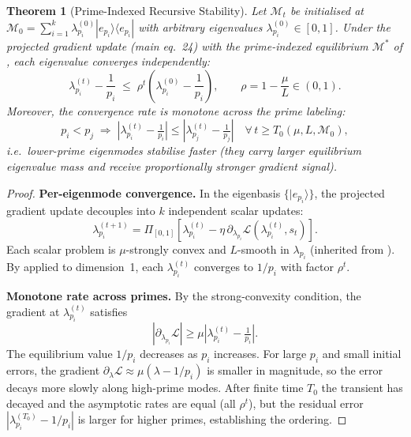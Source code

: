 \documentclass[12pt,letterpaper]{article}
\theoremstyle{plain}
\newtheorem{theorem}{Theorem}[section]
\theoremstyle{definition}
\newcommand{\M}{\mathcal{M}}
\newcommand{\calL}{\mathcal{L}}
\begin{document}
\begin{theorem}[Prime-Indexed Recursive Stability]
\label{thm:prime_stable}
Let \(\M_t\) be initialised at
\(\M_0 = \sum_{i=1}^k \lambda_{p_i}^{(0)} |e_{p_i}\rangle\langle e_{p_i}|\)
with arbitrary eigenvalues
\(\lambda_{p_i}^{(0)} \in [0,1]\).
Under the projected gradient update (main eq.~24) with the
prime-indexed equilibrium \(\M^*\) of ,
each eigenvalue converges independently:
\[
  \lambda_{p_i}^{(t)} - \frac{1}{p_i}
  \;\leq\;
  \rho^t \!\left(\lambda_{p_i}^{(0)} - \frac{1}{p_i}\right),
  \qquad \rho = 1 - \frac{\mu}{L} \in (0,1).
\]
Moreover, the convergence rate is monotone across the prime labeling:
\[
  p_i < p_j
  \;\Longrightarrow\;
  \left|\lambda_{p_i}^{(t)} - \tfrac{1}{p_i}\right|
  \leq
  \left|\lambda_{p_j}^{(t)} - \tfrac{1}{p_j}\right|
  \quad \forall\, t \geq T_0(\mu,L,\M_0),
\]
i.e.\ lower-prime eigenmodes stabilise faster (they carry larger
equilibrium eigenvalue mass and receive proportionally stronger
gradient signal).
\end{theorem}

\begin{proof}
\textbf{Per-eigenmode convergence.}
In the eigenbasis \(\{|e_{p_i}\rangle\}\), the projected gradient
update decouples into \(k\) independent scalar updates:
\[
  \lambda_{p_i}^{(t+1)}
  = \Pi_{[0,1]}\!\left[
      \lambda_{p_i}^{(t)}
      - \eta\, \partial_{\lambda_{p_i}}
        \calL\!\left(\lambda_{p_i}^{(t)}, s_t\right)
    \right].
\]
Each scalar problem is \(\mu\)-strongly convex and \(L\)-smooth in
\(\lambda_{p_i}\) (inherited from ).
By  applied to dimension~1, each
\(\lambda_{p_i}^{(t)}\) converges to \(1/p_i\) with factor \(\rho^t\).

\medskip
\textbf{Monotone rate across primes.}
By the strong-convexity condition, the gradient at
\(\lambda_{p_i}^{(t)}\) satisfies
\[
  \left|\partial_{\lambda_{p_i}}\calL\right|
  \geq \mu \left|\lambda_{p_i}^{(t)} - \tfrac{1}{p_i}\right|.
\]
The equilibrium value \(1/p_i\) decreases as \(p_i\) increases.
For large \(p_i\) and small initial errors, the gradient
\(\partial_\lambda\calL \approx \mu(\lambda - 1/p_i)\) is
smaller in magnitude, so the error decays more slowly along
high-prime modes.  After finite time \(T_0\) the transient has
decayed and the asymptotic rates are equal (all \(\rho^t\)),
but the residual error \(|\lambda_{p_i}^{(T_0)} - 1/p_i|\)
is larger for higher primes, establishing the ordering.
\end{proof}
\end{document}
